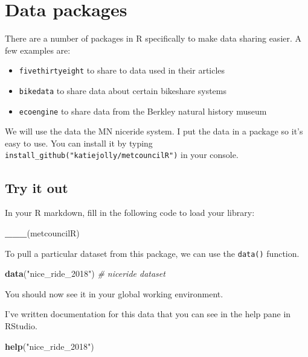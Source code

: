 \documentclass[]{book}
\newenvironment{Shaded}{\begin{snugshade}}{\end{snugshade}}
\newcommand{\KeywordTok}[1]{\textcolor[rgb]{0.13,0.29,0.53}{\textbf{#1}}}
\newcommand{\StringTok}[1]{\textcolor[rgb]{0.31,0.60,0.02}{#1}}
\newcommand{\CommentTok}[1]{\textcolor[rgb]{0.56,0.35,0.01}{\textit{#1}}}
\newcommand{\NormalTok}[1]{#1}
\begin{document}
\section{Data packages}\label{data-packages}

There are a number of packages in R specifically to make data sharing
easier. A few examples are:

\begin{itemize}
\item
  \texttt{fivethirtyeight} to share to data used in their articles
\item
  \texttt{bikedata} to share data about certain bikeshare systems
\item
  \texttt{ecoengine} to share data from the Berkley natural history
  museum
\end{itemize}

We will use the data the MN niceride system. I put the data in a package
so it's easy to use. You can install it by typing
\texttt{install\_github("katiejolly/metcouncilR")} in your console.

\subsection{Try it out}\label{try-it-out-1}

In your R markdown, fill in the following code to load your library:

\begin{Shaded}
\begin{Highlighting}[]
\KeywordTok{___}\NormalTok{(metcouncilR)}
\end{Highlighting}
\end{Shaded}

To pull a particular dataset from this package, we can use the
\texttt{data()} function.

\begin{Shaded}
\begin{Highlighting}[]
\KeywordTok{data}\NormalTok{(}\StringTok{"nice_ride_2018"}\NormalTok{) }\CommentTok{# niceride dataset}
\end{Highlighting}
\end{Shaded}

You should now see it in your global working environment.

I've written documentation for this data that you can see in the help
pane in RStudio.

\begin{Shaded}
\begin{Highlighting}[]
\KeywordTok{help}\NormalTok{(}\StringTok{"nice_ride_2018"}\NormalTok{)}
\end{Highlighting}
\end{Shaded}
\end{document}
